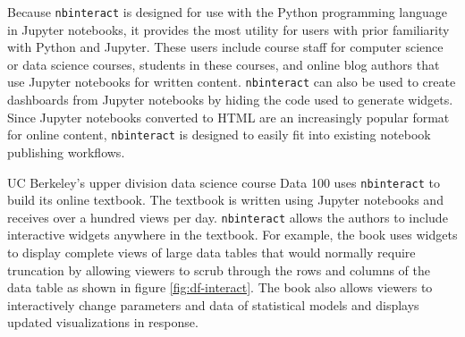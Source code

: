 \documentclass[nobib]{tufte-handout}
\newcommand{\code}[1]{\texttt{#1}}
\begin{document}
Because \code{nbinteract} is designed for use with the Python programming
language in Jupyter notebooks, it provides the most utility for users with
prior familiarity with Python and Jupyter. These users include course staff for
computer science or data science courses, students in these courses, and online
blog authors that use Jupyter notebooks for written content. \code{nbinteract}
can also be used to create dashboards from Jupyter notebooks by hiding the
code used to generate widgets. Since Jupyter notebooks converted to HTML are an
increasingly popular format for online content, \code{nbinteract} is designed
to easily fit into existing notebook publishing workflows.

UC Berkeley's upper division data science course Data 100 uses
\code{nbinteract} to build its online textbook. The textbook is written using Jupyter
notebooks and receives over a hundred views per day. \code{nbinteract} allows
the authors to include interactive widgets anywhere in the textbook. For
example, the book uses widgets to display complete views of large data tables
that would normally require truncation by allowing viewers to scrub through the
rows and columns of the data table as shown in figure \ref{fig:df-interact}.
The book also allows viewers to interactively change parameters and data of
statistical models and displays updated visualizations in response.
\end{document}
